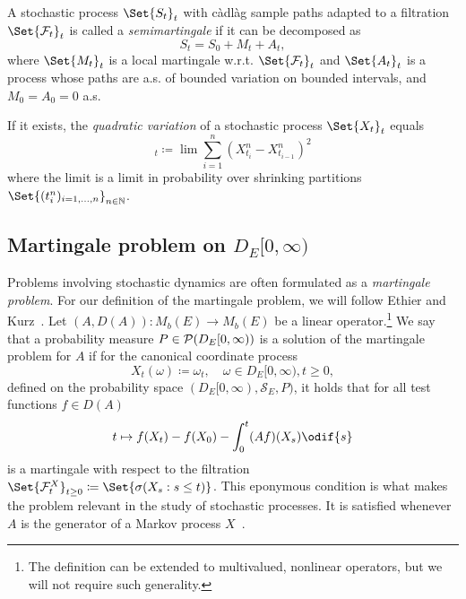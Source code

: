 \begin{definition}
  A stochastic process \(\Set{S_t}_{t}\) with càdlàg sample paths adapted to a filtration \(\Set{\cF_t}_t\) is called a \textit{semimartingale} if it can be decomposed as
  \begin{equation}
    S_t = S_0 + M_t + A_t,
  \end{equation}
  where \( \Set{M_t}_{t} \) is a local martingale w.r.t. \(\Set{\cF_t}_t\) and \( \Set{A_t}_{t} \) is a process whose paths are a.s. of bounded variation on bounded intervals, and \( M_0 = A_0 = 0 \) a.s.
\end{definition}

\begin{definition}
  If it exists, the \textit{quadratic variation} of a stochastic process \(\Set{X_t}_{t}\) equals
  \begin{equation}
    [X]_t \coloneqq \lim \sum_{i=1}^n (X_{t_i}^n - X_{t_{i-1}}^n)^2
  \end{equation}
  where the limit is a limit in probability over shrinking partitions \(\Set{(t_i^n)_{i=1,\dots,n}}_{n\in\bN}\).
\end{definition}



\subsection{Martingale problem on \texorpdfstring{\(D_E[0,\infty)\)}{D([0,infinity), E)}}\label{sec:martingale-problem}

Problems involving stochastic dynamics are often formulated as a \textit{martingale problem}.
For our definition of the martingale problem, we will follow Ethier and Kurz~\cite[p.174]{ethierMarkovProcessesCharacterization1985}.
Let \((A, D(A)) : M_b(E) \to M_b(E)\) be a linear operator.\footnote{The definition can be extended to multivalued, nonlinear operators, but we will not require such generality.}
We say that a probability measure \(P \in \mathcal{P}(D_E[0,\infty))\) is a solution of the martingale problem for \(A\) if for the canonical coordinate process
\begin{equation}
  X_t(\omega) \coloneqq \omega_t, \quad \omega \in D_E[0,\infty), t \geq 0,
\end{equation}
defined on the probability space \((D_E[0,\infty), \mathscr{S}_E, P)\), it holds that for all test functions \(f \in D(A)\)
\begin{equation}\label{eq:mart-problem}
  t \mapsto f(X_t) - f(X_0) - \int_0^t (Af)(X_s) \odif{s}
\end{equation}
is a martingale with respect to the filtration \(\Set{\cF_t^X}_{t\geq0} \coloneqq \Set{\sigma(X_s : s \leq t)}\). %
This eponymous condition is what makes the problem relevant in the study of stochastic processes.
It is satisfied whenever \(A\) is the generator of a Markov process \(X\)~\cite[161-162]{ethierMarkovProcessesCharacterization1985}.

